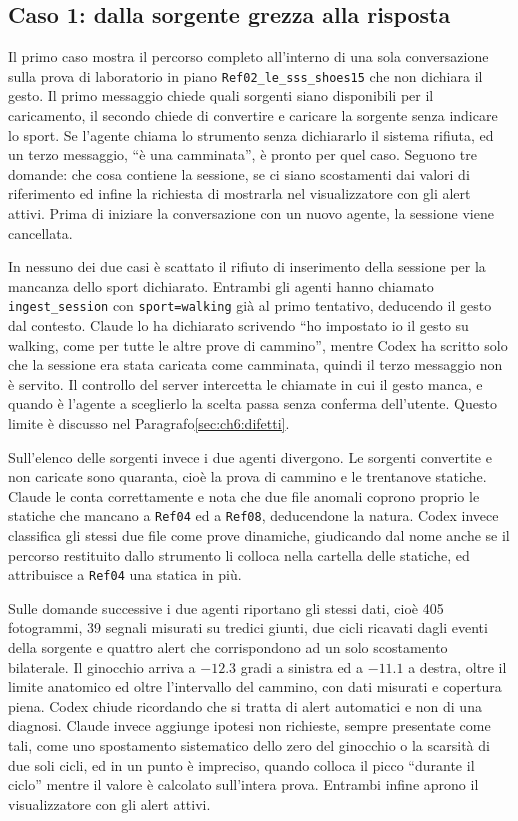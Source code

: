 \subsection{Caso 1: dalla sorgente grezza alla risposta}
\label{subsec:ch4:caso1}

Il primo caso mostra il percorso completo all'interno di una sola conversazione 
sulla prova di laboratorio in piano \texttt{Ref02\_le\_sss\_shoes15} che non
dichiara il gesto. Il primo messaggio chiede quali sorgenti siano disponibili per
il caricamento, il secondo chiede di convertire e caricare la sorgente senza
indicare lo sport. Se l'agente chiama lo strumento senza dichiararlo il sistema
rifiuta, ed un terzo messaggio, ``è una camminata'', è pronto per quel caso.
Seguono tre domande: che cosa contiene la sessione, se ci siano scostamenti dai
valori di riferimento ed infine la richiesta di mostrarla nel visualizzatore con
gli alert attivi. Prima di iniziare la conversazione con un nuovo agente, la sessione viene cancellata.

In nessuno dei due casi è scattato il rifiuto di inserimento della sessione per la mancanza dello sport dichiarato. Entrambi gli agenti hanno chiamato
\texttt{ingest\_session} con \texttt{sport=walking} già al primo tentativo,
deducendo il gesto dal contesto. Claude lo ha dichiarato scrivendo ``ho impostato
io il gesto su walking, come per tutte le altre prove di cammino'', mentre Codex
ha scritto solo che la sessione era stata caricata come camminata, quindi il
terzo messaggio non è servito. Il controllo del server intercetta le chiamate in
cui il gesto manca, e quando è l'agente a sceglierlo la scelta passa senza
conferma dell'utente. Questo limite è discusso nel
Paragrafo\ref{sec:ch6:difetti}.

Sull'elenco delle sorgenti invece i due agenti divergono. Le sorgenti convertite
e non caricate sono quaranta, cioè la prova di cammino e le trentanove statiche. Claude le conta correttamente
e nota che due file anomali coprono proprio le statiche che mancano a
\texttt{Ref04} ed a \texttt{Ref08}, deducendone la natura. Codex invece classifica
gli stessi due file come prove dinamiche, giudicando dal nome anche se il percorso
restituito dallo strumento li colloca nella cartella delle statiche, ed
attribuisce a \texttt{Ref04} una statica in più.

Sulle domande successive i due agenti riportano gli stessi dati, cioè 405
fotogrammi, 39 segnali misurati su tredici giunti, due cicli ricavati dagli eventi
della sorgente e quattro alert che corrispondono ad un solo scostamento
bilaterale. Il ginocchio arriva a $-12.3$ gradi a sinistra ed a $-11.1$ a destra,
oltre il limite anatomico ed oltre l'intervallo del cammino, con dati misurati e
copertura piena. Codex chiude ricordando che si tratta di alert automatici e non
di una diagnosi. Claude invece aggiunge ipotesi non richieste, sempre presentate
come tali, come uno spostamento sistematico dello zero del ginocchio o la
scarsità di due soli cicli, ed in un punto è impreciso, quando colloca il picco
``durante il ciclo'' mentre il valore è calcolato sull'intera prova. Entrambi
infine aprono il visualizzatore con gli alert attivi.

